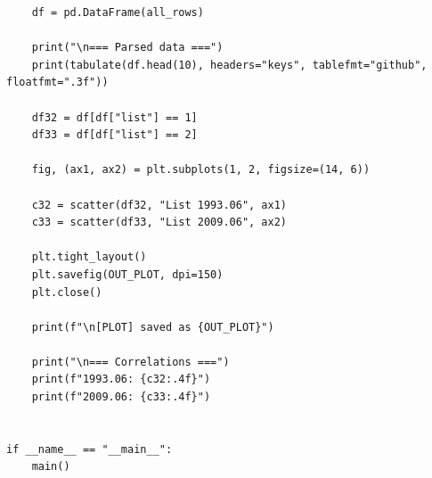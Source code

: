 \documentclass[14pt,a4paper]{extarticle}
\begin{document}
\begin{verbatim}
    df = pd.DataFrame(all_rows)

    print("\n=== Parsed data ===")
    print(tabulate(df.head(10), headers="keys", tablefmt="github", floatfmt=".3f"))

    df32 = df[df["list"] == 1]
    df33 = df[df["list"] == 2]

    fig, (ax1, ax2) = plt.subplots(1, 2, figsize=(14, 6))

    c32 = scatter(df32, "List 1993.06", ax1)
    c33 = scatter(df33, "List 2009.06", ax2)

    plt.tight_layout()
    plt.savefig(OUT_PLOT, dpi=150)
    plt.close()

    print(f"\n[PLOT] saved as {OUT_PLOT}")

    print("\n=== Correlations ===")
    print(f"1993.06: {c32:.4f}")
    print(f"2009.06: {c33:.4f}")


if __name__ == "__main__":
    main()


\end{verbatim}
\end{document}
